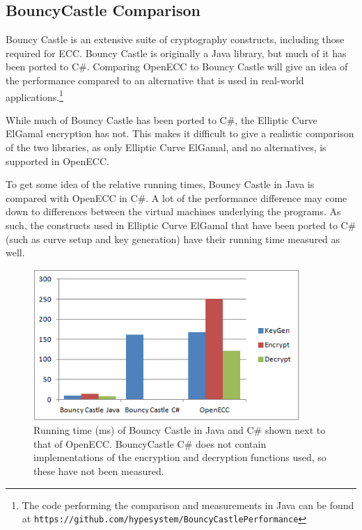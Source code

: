 \subsection{BouncyCastle Comparison}
\label{sec:performance_bouncycastle}

Bouncy Castle is an extensive suite of cryptography constructs, including those required for ECC. Bouncy Castle is originally a
Java library, but much of it has been ported to C\#.\cite{bouncycastle} Comparing OpenECC to Bouncy Castle will give an idea of the performance
compared to an alternative that is used in real-world applications.\footnote{The code performing the comparison and measurements
in Java can be found at \texttt{https://github.com/hypesystem/BouncyCastlePerformance}}

While much of Bouncy Castle has been ported to C\#, the Elliptic Curve ElGamal encryption has not. This makes it difficult to
give a realistic comparison of the two libraries, as only Elliptic Curve ElGamal, and no alternatives, is supported in OpenECC.

To get some idea of the relative running times, Bouncy Castle in Java is compared with OpenECC in C\#. A lot of the performance
difference may come down to differences between the virtual machines underlying the programs. As such, the constructs used in
Elliptic Curve ElGamal that have been ported to C\# (such as curve setup and key generation) have their running time measured
as well.

\begin{figure}[htb!]
	\centering
	\includegraphics[width=0.9\textwidth]{performance/bouncycastle-comparison}
	\caption{Running time (ms) of Bouncy Castle in Java and C\# shown next to that of OpenECC. BouncyCastle C\# does not contain
		implementations of the encryption and decryption functions used, so these have not been measured.}
	\label{fig:bouncycastle-comparison-graph}
\end{figure}

